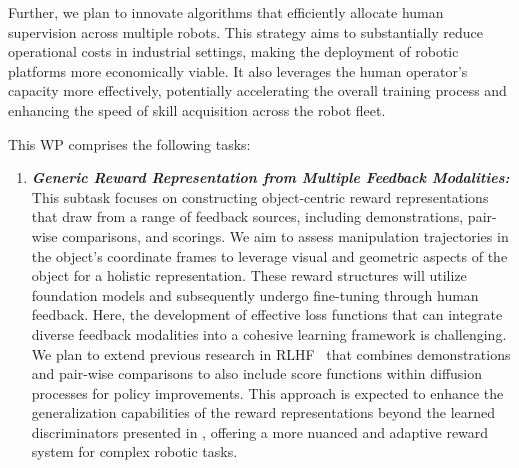 \documentclass{erc-B2}
\begin{document}
Further, we plan to innovate algorithms that efficiently allocate human supervision across multiple robots. This strategy aims to substantially reduce operational costs in industrial settings, making the deployment of robotic platforms more economically viable. It also leverages the human operator’s capacity more effectively, potentially accelerating the overall training process and enhancing the speed of skill acquisition across the robot fleet.

This WP comprises the following tasks:
\begin{enumerate}
\item \textit{\textbf{Generic Reward Representation from Multiple Feedback Modalities:}} 
This subtask focuses on constructing object-centric reward representations~\cite{freymuth2022vigor} that draw from a range of feedback sources, including demonstrations, pair-wise comparisons, and scorings. We aim to assess manipulation trajectories in the object's coordinate frames to leverage visual and geometric aspects of the object for a holistic representation. These reward structures will utilize foundation models and subsequently undergo fine-tuning through human feedback. Here, the development of effective loss functions that can integrate diverse feedback modalities into a cohesive learning framework is challenging. We plan to extend previous research in RLHF~\cite{taranovic2023ailp} that combines demonstrations and pair-wise comparisons to also include score functions within diffusion processes for policy improvements. This approach is expected to enhance the generalization capabilities of the reward representations beyond the learned discriminators presented in \cite{taranovic2023ailp}, offering a more nuanced and adaptive reward system for complex robotic tasks.


\end{enumerate}
\end{document}
